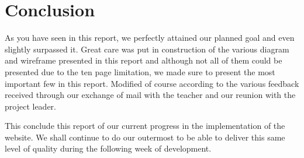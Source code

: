 \section{Conclusion}


As you have seen in this report, we perfectly attained our planned goal and even slightly surpassed it. Great care was put in construction of the various diagram and wireframe presented in this report and although not all of them could be presented due to the ten page limitation, we made sure to present the most important few in this report. Modified of course according to the various feedback received through our exchange of mail with the teacher and our reunion with the project leader.

This conclude this report of our current progress in the implementation of the website. We shall continue to do our outermost to be able to deliver this same level of quality during the following week of development. 